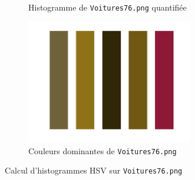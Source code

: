\documentclass[a4paper]{article}
\begin{document}
\begin{figure}[H]
\begin{subfigure}[c]{0.46\textwidth}
        \caption{Histogramme de \texttt{Voitures76.png} quantifiée}
    \end{subfigure}
    \begin{subfigure}[c]{0.46\textwidth}
        \centering
        \includegraphics[width=0.8\textwidth]{images/Voitures76_domi.png}
        \caption{Couleurs dominantes de \texttt{Voitures76.png}}
    \end{subfigure}

    \caption{Calcul d'histogrammes HSV sur \texttt{Voitures76.png}} 
    \label{fig:ex1_Voitures76}
\end{figure}
\end{document}
